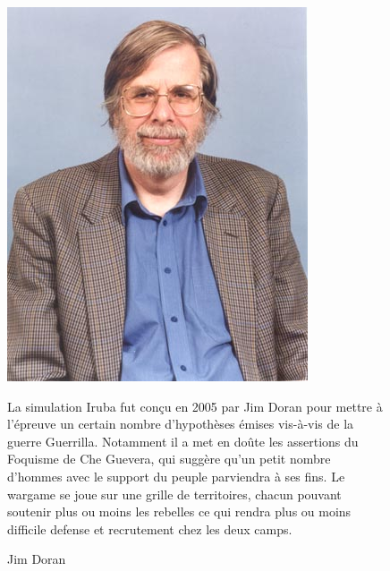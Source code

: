 \documentclass{article}
\begin{document}
\begin{center}
\begin{figure}[H]
\hfill
\begin{minipage}[H]{0.2\linewidth}
	\centering
	\includegraphics[width=\textwidth]{../ressources/doran}
	\caption{Jim Doran}
\end{minipage}
\hfill
\begin{minipage}[H]{0.7\linewidth}
La simulation Iruba fut conçu en 2005 par Jim Doran pour mettre à l'épreuve un certain nombre d'hypothèses émises vis-à-vis de la guerre Guerrilla. Notamment il a met en doûte les assertions du Foquisme de Che Guevera, qui suggère qu'un petit nombre d'hommes avec le support du peuple parviendra à ses fins.
Le \og{}wargame\fg{} se joue sur une grille de territoires, chacun pouvant soutenir plus ou moins les rebelles ce qui rendra plus ou moins difficile defense et recrutement chez les deux camps.
\end{minipage}
\hfill
\end{figure}
\end{center}
\end{document}
